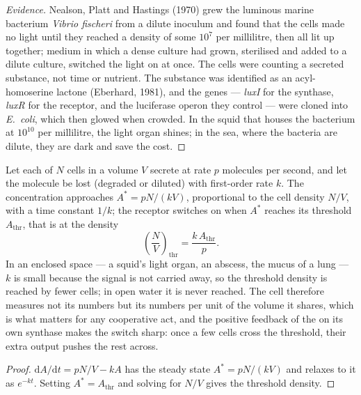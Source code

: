 \begin{proof}[Evidence]
Nealson, Platt and Hastings (1970) grew the luminous marine bacterium
\emph{Vibrio fischeri} from a dilute inoculum and found that the cells
made no light until they reached a density of some $10^{7}$ per
millilitre, then all lit up together; medium in which a dense culture
had grown, sterilised and added to a dilute culture, switched the light
on at once. The cells were counting a secreted substance, not time or
nutrient. The substance was identified as an acyl-homoserine lactone
(Eberhard, 1981), and the genes --- \emph{luxI} for the synthase,
\emph{luxR} for the receptor, and the luciferase operon they control ---
were cloned into \emph{E.~coli}, which then glowed when crowded. In
the squid that houses the bacterium at $10^{10}$ per millilitre, the
light organ shines; in the sea, where the bacteria are dilute, they are
dark and save the cost.
\end{proof}

\begin{proposition}\label{prop:b3:bacteriology:threshold}
Let each of $N$ cells in a volume $V$ secrete  at rate $p$
molecules per second, and let the molecule be lost (degraded or
diluted) with first-order rate $k$. The concentration approaches
$A^{*} = pN/(kV)$, proportional to the cell density $N/V$, with a
time constant $1/k$; the receptor switches on when $A^{*}$ reaches its
threshold $A_{\text{thr}}$, that is at the density
\[
\left(\frac{N}{V}\right)_{\text{thr}} = \frac{k\,A_{\text{thr}}}{p}.
\]
In an enclosed space --- a squid's light organ, an abscess, the mucus
of a lung --- $k$ is small because the signal is not carried away, so
the threshold density is reached by fewer cells; in open water it is
never reached. The cell therefore measures not its numbers but its
numbers per unit of the volume it shares, which is what matters for
any cooperative act, and the positive feedback of the  on
its own synthase makes the switch sharp: once a few cells cross the
threshold, their extra output pushes the rest across.
\end{proposition}
\begin{proof}
$\mathrm{d}A/\mathrm{d}t = pN/V - kA$ has the steady state $A^{*} =
pN/(kV)$ and relaxes to it as $e^{-kt}$. Setting $A^{*} = A_{\text{thr}}$
and solving for $N/V$ gives the threshold density.
\end{proof}

